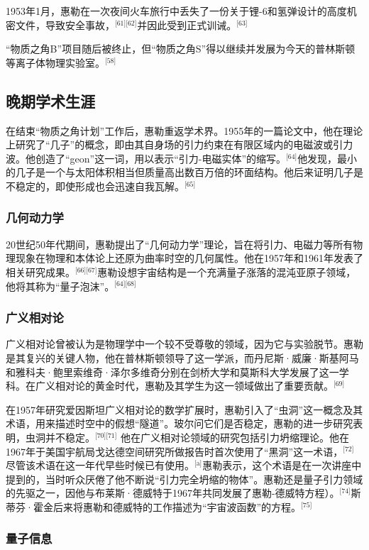 1953年1月，惠勒在一次夜间火车旅行中丢失了一份关于锂-6和氢弹设计的高度机密文件，导致安全事故，\(^\text{[61][62]}\)并因此受到正式训诫。\(^\text{[63]}\)

“物质之角B”项目随后被终止，但“物质之角S”得以继续并发展为今天的普林斯顿等离子体物理实验室。\(^\text{[58]}\)
\subsection{晚期学术生涯}
在结束“物质之角计划”工作后，惠勒重返学术界。1955年的一篇论文中，他在理论上研究了“几子”的概念，即由其自身场的引力约束在有限区域内的电磁波或引力波。他创造了“geon”这一词，用以表示“引力-电磁实体”的缩写。\(^\text{[64]}\)他发现，最小的几子是一个与太阳体积相当但质量高出数百万倍的环面结构。他后来证明几子是不稳定的，即使形成也会迅速自我瓦解。\(^\text{[65]}\)
\subsubsection{几何动力学}
20世纪50年代期间，惠勒提出了“几何动力学”理论，旨在将引力、电磁力等所有物理现象在物理和本体论上还原为曲率时空的几何属性。他在1957年和1961年发表了相关研究成果。\(^\text{[66][67]}\)惠勒设想宇宙结构是一个充满量子涨落的混沌亚原子领域，他将其称为“量子泡沫”。\(^\text{[64][68]}\)
\subsubsection{广义相对论}
广义相对论曾被认为是物理学中一个较不受尊敬的领域，因为它与实验脱节。惠勒是其复兴的关键人物，他在普林斯顿领导了这一学派，而丹尼斯·威廉·斯基阿马和雅科夫·鲍里索维奇·泽尔多维奇分别在剑桥大学和莫斯科大学发展了这一学科。在广义相对论的黄金时代，惠勒及其学生为这一领域做出了重要贡献。\(^\text{[69]}\)

在1957年研究爱因斯坦广义相对论的数学扩展时，惠勒引入了“虫洞”这一概念及其术语，用来描述时空中的假想“隧道”。玻尔问它们是否稳定，惠勒的进一步研究表明，虫洞并不稳定。\(^\text{[70][71]}\) 他在广义相对论领域的研究包括引力坍缩理论。他在1967年于美国宇航局戈达德空间研究所做报告时首次使用了“黑洞”这一术语，\(^\text{[72]}\)尽管该术语在这一年代早些时候已有使用。\(^\text{[a]}\)惠勒表示，这个术语是在一次讲座中提到的，当时听众厌倦了他不断说“引力完全坍缩的物体”。惠勒还是量子引力领域的先驱之一，因他与布莱斯·德威特于1967年共同发展了惠勒-德威特方程）。\(^\text{[74]}\)斯蒂芬·霍金后来将惠勒和德威特的工作描述为“宇宙波函数”的方程。\(^\text{[75]}\)
\subsubsection{量子信息}

